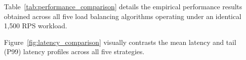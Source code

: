\documentclass[12pt,openany]{report}
\begin{document}
Table~\ref{tab:performance_comparison} details the empirical performance results obtained across all five load balancing algorithms operating under an identical 1,500 RPS workload.

\begin{table}[H]
\centering
\small
{}
\caption{Empirical performance benchmark across all 5 load balancing strategies at 1,500 RPS.}
\label{tab:performance_comparison}
\end{table}

Figure~\ref{fig:latency_comparison} visually contrasts the mean latency and tail (P99) latency profiles across all five strategies.
\end{document}
